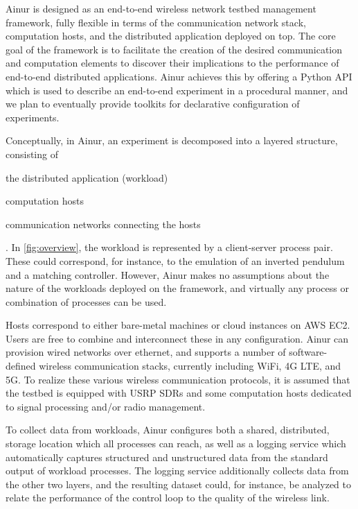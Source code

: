 Ainur is designed as an end-to-end wireless network testbed management framework, fully flexible in terms of the communication network stack, computation hosts, and the distributed application deployed on top.
The core goal of the framework is to facilitate the creation of the desired communication and computation elements to discover their implications to the performance of end-to-end distributed applications.
Ainur achieves this by offering a Python \gls{API} which is used to describe an end-to-end experiment in a procedural manner, and we plan to eventually provide toolkits for declarative configuration of experiments.

Conceptually, in Ainur, an experiment is decomposed into a layered structure, consisting of
\begin{enumerate*}[itemjoin={{; }}, itemjoin*={{; and }}]
    \item the distributed application (workload)
    \item computation hosts
    \item communication networks connecting the hosts
\end{enumerate*}.
In \cref{fig:overview}, the workload is represented by a client-server process pair.
These could correspond, for instance, to the emulation of an inverted pendulum and a matching controller.
However, Ainur makes no assumptions about the nature of the workloads deployed on the framework, and virtually any process or combination of processes can be used.

Hosts correspond to either bare-metal machines or cloud instances on \gls{AWS} \gls{EC2}.
Users are free to combine and interconnect these in any configuration.
Ainur can provision wired networks over ethernet, and supports a number of software-defined wireless communication stacks, currently including WiFi, 4G \gls{LTE}, and 5G.
To realize these various wireless communication protocols, it is assumed that the testbed is equipped with \gls{USRP} \gls{SDR}s and some computation hosts dedicated to signal processing and/or radio management.

To collect data from workloads, Ainur configures both a shared, distributed, storage location which all processes can reach, as well as a logging service which automatically captures structured and unstructured data from the standard output of workload processes.
The logging service additionally collects data from the other two layers, and the resulting dataset could, for instance, be analyzed to relate the performance of the control loop to the quality of the wireless link. 

